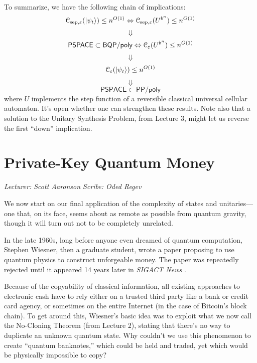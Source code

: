 \documentclass[12pt]{report}
\theoremstyle{plain}
\theoremstyle{definition}
\newcommand{\eps}{\varepsilon}
\renewcommand{\ket}[1]{|#1\rangle}
\newcommand{\lecture}[3]{%
  \chapter{#3}%
  \vspace{-5ex}%
  \textit{Lecturer: #1 \hfill Scribe: #2}\par%
  \vspace{1ex}\titlerule\vspace{2ex}}
\begin{document}
To summarize, we have the following chain of implications:
\[
{\cal C}_{\mathrm{sep},\eps}(\ket{\psi_t}) \le n^{O(1)} \Leftrightarrow {\cal C}_{\mathrm{sep},\eps}(U^{b^n}) \le n^{O(1)}
\]
\[
\Downarrow
\]
\[
\mathsf{PSPACE} \subset \mathsf{BQP/poly} \Leftrightarrow {\cal C}_\eps(U^{b^n}) \le n^{O(1)}
\]
\[
\Downarrow
\]
\[
{\cal C}_{\eps}(\ket{\psi_t}) \le n^{O(1)}
\]
\[
\Downarrow
\]
\[
\mathsf{PSPACE} \subset \mathsf{PP/poly}
\]
where $U$ implements the step function of a reversible classical universal cellular automaton.
It's open whether one can strengthen these results.  Note also that a solution to the Unitary Synthesis Problem, from Lecture 3, might let us reverse the first ``down'' implication.


\lecture{Scott Aaronson}{Oded Regev}{Private-Key Quantum Money}

We now start on our final application of the complexity of states and unitaries---one that, on its face, seems about as remote as possible from quantum gravity, though it will turn out not to be completely unrelated.

In the late 1960s, long before anyone even dreamed of quantum computation, Stephen Wiesner, then a graduate student, wrote a paper proposing to use quantum physics to construct unforgeable money. The paper was repeatedly rejected until it appeared 14 years later in {\em SIGACT News} \cite{wiesner}.

Because of the copyability of classical information, all existing approaches to electronic cash have to rely either on a trusted third party like a bank or credit card agency, or sometimes on the entire Internet (in the case of Bitcoin's block chain).  To get around this, Wiesner's basic idea was to exploit what we now call the No-Cloning Theorem (from Lecture 2), stating that there's no way to duplicate an unknown quantum state.  Why couldn't we use this phenomenon to create ``quantum banknotes,'' which could be held and traded, yet which would be physically impossible to copy?
\end{document}
